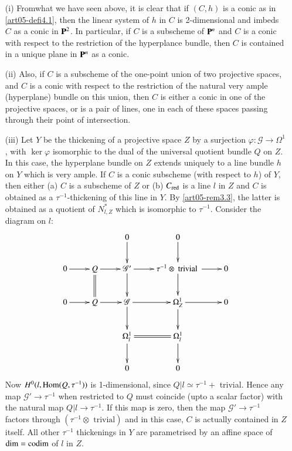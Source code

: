 \begin{remarks}\label{art05-rems4.4}
\begin{itemize}
\item[(i)] From\pageoriginale what we have seen above, it is clear
that if $(C,h)$ 
is a conic as in \ref{art05-defi4.1}, then the linear system of $h$ in
$C$ is 2-dimensional and imbeds $C$ as a conic in $\mathbf{P}^{2}$. In
particular, if $C$ is a subscheme of $\mathbf{P}^{n}$ and $C$ is a conic
with respect to the restriction of the hyperplance bundle, then $C$ is
contained in a unique plane in $\mathbf{P}^{n}$ as a conic.

\item[(ii)] Also, if $C$ is a subscheme of the one-point union of two
projective spaces, and $C$ is a conic with respect to the restriction
of the natural very ample (hyperplane) bundle on this union, then $C$
is either a conic in one of the projective spaces, or is a pair of
lines, one in each of these spaces passing through their point of
intersection. 

\item[(iii)] Let $Y$ be the thickening of a projective space $Z$ by a
surjection $\varphi:\mathscr{G}\to \Omega^{1}$, with $\ker \varphi$
isomorphic to the dual of the universal quotient bundle $Q$ on $Z$. In
this case, the hyperplane bundle on $Z$ extends uniquely to a line
bundle $h$ on $Y$ which is very ample. If $C$ is a conic subscheme
(with respect to $h$) of $Y$, then either (a) $C$ is a subscheme of
$Z$ or (b) $C_{\operatorname{red}}$ is a line $l$ in $Z$ and $C$ is obtained as a
$\tau^{-1}$-thickening of this line in $Y$. By \ref{art05-rem3.3}, the
latter is obtained as a quotient of $N^{*}_{l,Z}$ which is isomorphic
to $\tau^{-1}$. Consider the diagram on $l$:
\[
\xymatrix{
 & & 0\ar[d] & 0\ar[d]  \\
0\ar[r] & Q\ar[r]\ar@{=}[d] & \mathscr{G}'\ar[r]\ar[d]
& \tau^{-1}\otimes \text{~trivial~}\ar[r]\ar[d] & 0\\
0\ar[r] & Q\ar[r] & \mathscr{G}\ar[r]\ar[d] & \Omega^{1}_{Z}\ar[r]\ar[d] & 0\\
 & & \Omega^{1}_{l}\ar@{=}[r]\ar[d] & \Omega^{1}_{l}\ar[d] & \\
 & & 0 & 0 &
}
\]
Now $H^{0}(l,\operatorname{Hom}(Q,\tau^{-1}))$ is 1-dimensional, since
$Q|l\simeq \tau^{-1}+$ trivial. Hence any map
$\mathscr{G}'\to \tau^{-1}$ when restricted to $Q$ must coincide (upto
a scalar factor) with the natural map $Q|l\to \tau^{-1}$. If this map
is zero, then the map $\mathscr{G}'\to \tau^{-1}$ factors through
$(\tau^{-1}\otimes \text{~trivial})$ and in this case, $C$ is actually
contained in $Z$ itself. All other $\tau^{-1}$ thickenings in $Y$ are
parametrised by an affine space of $\dim =\operatorname{codim}$ of $l$ in $Z$. 


\end{itemize}
\end{remarks}
